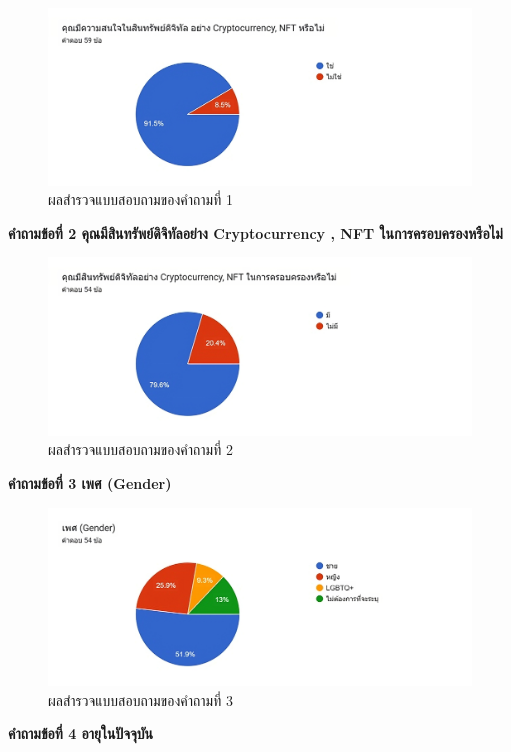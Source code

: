\documentclass[12pt,oneside,openright,a4paper]{cpe-thai-project}
\begin{document}
\begin{figure}[!thb]
			\centering
			\includegraphics[scale=0.4]{apprex1}
			\caption{ผลสำรวจแบบสอบถามของคำถามที่ 1}
		\end{figure}
\FloatBarrier
\bf คำถามข้อที่ 2 คุณมีสินทรัพย์ดิจิทัลอย่าง Cryptocurrency , NFT ในการครอบครองหรือไม่\\
\begin{figure}[!thb]
			\centering
			\includegraphics[scale=0.4]{apprex2}
			\caption{ผลสำรวจแบบสอบถามของคำถามที่ 2}
		\end{figure}
\FloatBarrier
\bf คำถามข้อที่ 3 เพศ (Gender)\\
\begin{figure}[!thb]
			\centering
			\includegraphics[scale=0.4]{apprex3}
			\caption{ผลสำรวจแบบสอบถามของคำถามที่ 3}
		\end{figure}
\FloatBarrier
\bf คำถามข้อที่ 4 อายุในปัจจุบัน\\
\end{document}
